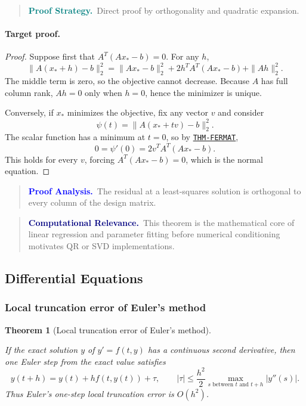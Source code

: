 \documentclass[10pt]{article}
\newcommand{\pidraw}[1]{\begingroup\urlstyle{tt}\nolinkurl{#1}\endgroup}
\newcommand{\pidref}[1]{\hyperref[prf:#1]{\pidraw{#1}}}
\newcommand{\pid}[1]{\pidref{#1}}
\newtheorem{theorem}{Theorem}[section]
\theoremstyle{definition}
\theoremstyle{remark}
\newenvironment{proofstrategy}
{\begin{quote}\small\noindent\textbf{\textcolor{teal}{Proof Strategy.}}\ }
{\end{quote}}
\newenvironment{proofanalysis}
{\begin{quote}\small\noindent\textbf{\textcolor{blue}{Proof Analysis.}}\ }
{\end{quote}}
\newenvironment{computationalrelevance}
{\begin{quote}\small\noindent\textbf{\textcolor{navy}{Computational Relevance.}}\ }
{\end{quote}}
\begin{document}
\begin{proofstrategy}Direct proof by orthogonality and quadratic expansion.\end{proofstrategy}

\paragraph{Target proof.}

\begin{proof}

Suppose first that $A^T(Ax_*-b)=0$. For any $h$,
\[
\|A(x_*+h)-b\|_2^2
=
\|Ax_*-b\|_2^2
+2h^TA^T(Ax_*-b)+\|Ah\|_2^2.
\]
The middle term is zero, so the objective cannot decrease. Because $A$ has full
column rank, $Ah=0$ only when $h=0$, hence the minimizer is unique.

Conversely, if $x_*$ minimizes the objective, fix any vector $v$ and consider
\[
\psi(t)=\|A(x_*+tv)-b\|_2^2.
\]
The scalar function has a minimum at $t=0$, so by \pid{THM-FERMAT},
\[
0=\psi'(0)=2v^TA^T(Ax_*-b).
\]
This holds for every $v$, forcing $A^T(Ax_*-b)=0$, which is the normal equation.

\end{proof}

\begin{proofanalysis}The residual at a least-squares solution is orthogonal to every column of the design matrix.\end{proofanalysis}

\begin{computationalrelevance}This theorem is the mathematical core of linear regression and parameter fitting before numerical conditioning motivates QR or SVD implementations.\end{computationalrelevance}

\subsection{Differential Equations}

\subsubsection{Local truncation error of Euler's method}

\begin{theorem}[Local truncation error of Euler's method]\label{prf:ERR-EULER-LOCAL}

If the exact solution $y$ of $y'=f(t,y)$ has a continuous second derivative, then one Euler step from the exact value satisfies
\[
y(t+h)=y(t)+h f(t,y(t))+\tau,\qquad
|\tau|\le \frac{h^2}{2}\max_{s\text{ between }t\text{ and }t+h}|y''(s)|.
\]
Thus Euler's one-step local truncation error is $O(h^2)$.

\end{theorem}
\end{document}
